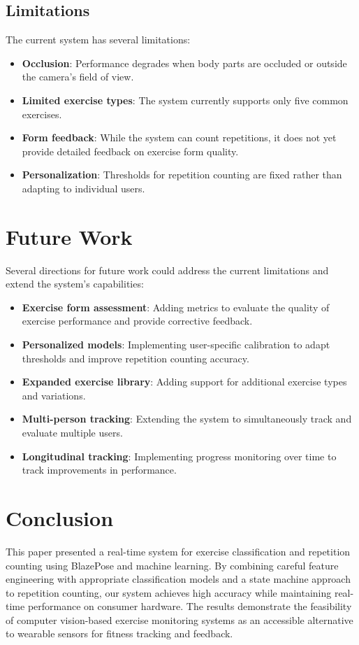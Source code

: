 \documentclass[conference]{IEEEtran}
\begin{document}
\subsection{Limitations}
The current system has several limitations:

\begin{itemize}
    \item \textbf{Occlusion}: Performance degrades when body parts are occluded or outside the camera's field of view.
    \item \textbf{Limited exercise types}: The system currently supports only five common exercises.
    \item \textbf{Form feedback}: While the system can count repetitions, it does not yet provide detailed feedback on exercise form quality.
    \item \textbf{Personalization}: Thresholds for repetition counting are fixed rather than adapting to individual users.
\end{itemize}

\section{Future Work}
Several directions for future work could address the current limitations and extend the system's capabilities:

\begin{itemize}
    \item \textbf{Exercise form assessment}: Adding metrics to evaluate the quality of exercise performance and provide corrective feedback.
    \item \textbf{Personalized models}: Implementing user-specific calibration to adapt thresholds and improve repetition counting accuracy.
    \item \textbf{Expanded exercise library}: Adding support for additional exercise types and variations.
    \item \textbf{Multi-person tracking}: Extending the system to simultaneously track and evaluate multiple users.
    \item \textbf{Longitudinal tracking}: Implementing progress monitoring over time to track improvements in performance.
\end{itemize}

\section{Conclusion}
This paper presented a real-time system for exercise classification and repetition counting using BlazePose and machine learning. By combining careful feature engineering with appropriate classification models and a state machine approach to repetition counting, our system achieves high accuracy while maintaining real-time performance on consumer hardware. The results demonstrate the feasibility of computer vision-based exercise monitoring systems as an accessible alternative to wearable sensors for fitness tracking and feedback.
\end{document}
